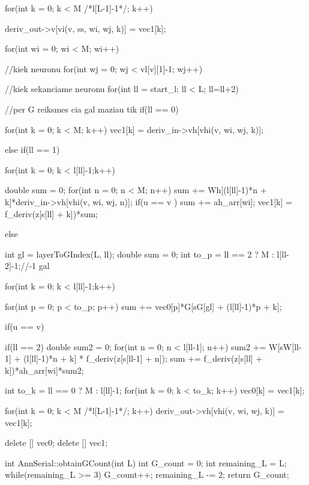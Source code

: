 {{{{{          }
          for(int k = 0; k < M /*l[L-1]-1*/; k++){
            deriv_out->v[vi(v, ss, wi, wj, k)] = vec1[k];

          }
        }
      }
    }

      for(int wi = 0; wi < M; wi++){//kiek neuronu
        for(int wj = 0; wj < vl[v][1]-1; wj++){//kiek sekanciame neuronu
          for(int ll = start_l; ll < L; ll=ll+2){//per G reiksmes  cia gal maziau tik
            if(ll == 0){

              for(int k = 0; k < M; k++)
                vec1[k] = deriv_in->vh[vhi(v, wi, wj, k)];

            }else if(ll == 1){

              for(int k = 0; k < l[ll]-1;k++){
                double sum = 0;
                for(int n = 0; n < M; n++)
                  sum += Wh[(l[ll]-1)*n + k]*deriv_in->vh[vhi(v, wi, wj, n)];
                if(u == v ) sum += ah_arr[wi];
                vec1[k] = f_deriv(z[s[ll] + k])*sum;

              }

            }else {


              int gl = layerToGIndex(L, ll);
              double sum = 0;
              int to_p = ll == 2 ? M : l[ll-2]-1;//-1 gal


              for(int k = 0; k < l[ll]-1;k++){
                for(int p = 0; p < to_p; p++){
                  sum += vec0[p]*G[sG[gl] + (l[ll]-1)*p + k];
                }


                if(u == v){

                  if(ll == 2){
                    double sum2 = 0;
                    for(int n = 0; n < l[ll-1]; n++)
                      sum2 += W[sW[ll-1] + (l[ll]-1)*n + k] * f_deriv(z[s[ll-1] + n]);
                    sum += f_deriv(z[s[ll] + k])*ah_arr[wi]*sum2;
                  }
                }
              }
            }

            int to_k = ll == 0 ? M : l[ll]-1;
            for(int k = 0; k < to_k; k++) vec0[k] = vec1[k];
          }

          for(int k = 0; k < M /*l[L-1]-1*/; k++){
            deriv_out->vh[vhi(v, wi, wj, k)] = vec1[k];
          }
        }
      }

  delete [] vec0;
  delete [] vec1;

}

int AnnSerial::obtainGCount(int L){
  int G_count = 0;
  int remaining_L = L;
  while(remaining_L >= 3){
    G_count++;
    remaining_L -= 2;
  }
  return G_count;
}

